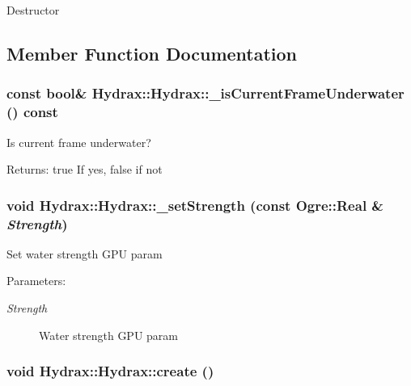Destructor 

\subsection{Member Function Documentation}
\hypertarget{class_hydrax_1_1_hydrax_1532419b2859aed22a63d913c527ce21}{
\subsubsection[{\_\-isCurrentFrameUnderwater}]{\setlength{\rightskip}{0pt plus 5cm}const bool\& Hydrax::Hydrax::\_\-isCurrentFrameUnderwater () const}}
\label{class_hydrax_1_1_hydrax_1532419b2859aed22a63d913c527ce21}


Is current frame underwater? \begin{Desc}
\item[Returns:]true If yes, false if not \end{Desc}
\hypertarget{class_hydrax_1_1_hydrax_a1c3ac9b604a3116fbd5b4d55429811d}{
\subsubsection[{\_\-setStrength}]{\setlength{\rightskip}{0pt plus 5cm}void Hydrax::Hydrax::\_\-setStrength (const Ogre::Real \& {\em Strength})}}
\label{class_hydrax_1_1_hydrax_a1c3ac9b604a3116fbd5b4d55429811d}


Set water strength GPU param \begin{Desc}
\item[Parameters:]
\begin{description}
\item[{\em Strength}]Water strength GPU param \end{description}
\end{Desc}
\hypertarget{class_hydrax_1_1_hydrax_af840e19208614533a6b344e32965ee2}{
\subsubsection[{create}]{\setlength{\rightskip}{0pt plus 5cm}void Hydrax::Hydrax::create ()}}
\label{class_hydrax_1_1_hydrax_af840e19208614533a6b344e32965ee2}



